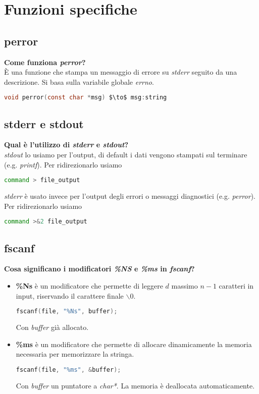 \newpage
\section{Funzioni specifiche}
\subsection{perror}
\textbf{Come funziona \textit{perror}?}\\
È una funzione che stampa un messaggio di errore su \textit{stderr} seguito da una descrizione. Si basa sulla variabile globale \textit{errno}.
\begin{lstlisting}[language=C, mathescape]
	void perror(const char *msg) $\to$ msg:string
\end{lstlisting}
\subsection{stderr e stdout}
\textbf{Qual è l'utilizzo di \textit{stderr} e \textit{stdout}?}\\
\textit{stdout} lo usiamo per l'output, di default i dati vengono stampati sul terminare (e.g. \textit{printf}). Per ridirezionarlo usiamo
\begin{lstlisting}[language=BASH]
	command > file_output
\end{lstlisting}
\textit{stderr} è usato invece per l'output degli errori o messaggi diagnostici (e.g. \textit{perror}). Per ridirezionarlo usiamo
\begin{lstlisting}[language=BASH]
	command >&2 file_output
\end{lstlisting}
\subsection{fscanf}
\textbf{Cosa significano i modificatori \textit{\%NS} e \textit{\%ms} in \textit{fscanf}?}\\
\begin{itemize}
	\item \textbf{\%Ns} è un modificatore che permette di leggere $d$ massimo $n-1$ caratteri in input, riservando il carattere finale \textit{$\backslash 0$}.
	\begin{lstlisting}[language=C]
		fscanf(file, "%Ns", buffer);
	\end{lstlisting}
	Con \textit{buffer} già allocato.
	\item \textbf{\%ms} è un modificatore che permette di allocare dinamicamente la memoria necessaria per memorizzare la stringa.
	\begin{lstlisting}[language=C]
		fscanf(file, "%ms", &buffer);
	\end{lstlisting}
	Con \textit{buffer} un puntatore a \textit{char*}. La memoria è deallocata automaticamente.
\end{itemize}
